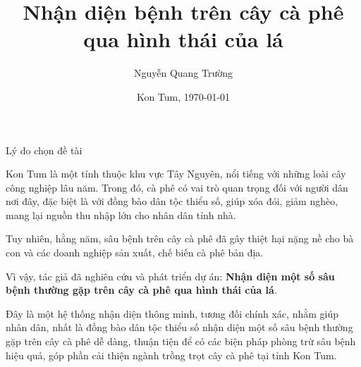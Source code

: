 \documentclass{beamer}
\title{Nhận diện bệnh trên cây cà phê\\ qua hình thái của lá}
\author{Nguyễn Quang Trường}
\institute{12 Toán - Trường THPT Chuyên Nguyễn Tất Thành}
\date{Kon Tum, \today}
\begin{document}
\frame{\titlepage}

\begin{frame}[allowframebreaks]{Lý do chọn đề tài}

	Kon Tum là một tỉnh thuộc khu vực Tây Nguyên, nổi tiếng với những loài cây công nghiệp lâu năm. Trong đó, cà phê có vai trò quan trọng đối với người dân nơi đây, đặc biệt là với đồng bào dân tộc thiểu số, giúp xóa đói, giảm nghèo, mang lại nguồn thu nhập lớn cho nhân dân tỉnh nhà.

	\framebreak

	Tuy nhiên, hằng năm, sâu bệnh trên cây cà phê đã gây thiệt hại nặng nề cho bà con và các doanh nghiệp sản xuất, chế biến cà phê bản địa.
	
	\framebreak
	
	Vì vậy, tác giả đã nghiên cứu và phát triển dự án: \textbf{Nhận diện một số sâu bệnh thường gặp trên cây cà phê qua hình thái của lá}.
	
	\null
	
	Đây là một hệ thống nhận diện thông minh, tương đối chính xác, nhằm giúp nhân dân, nhất là đồng bào dân tộc thiểu số nhận diện một số sâu bệnh thường gặp trên cây cà phê dễ dàng, thuận tiện để có các biện pháp phòng trừ sâu bệnh hiệu quả, góp phần cải thiện ngành trồng trọt cây cà phê tại tỉnh Kon Tum.

\end{frame}
\end{document}
